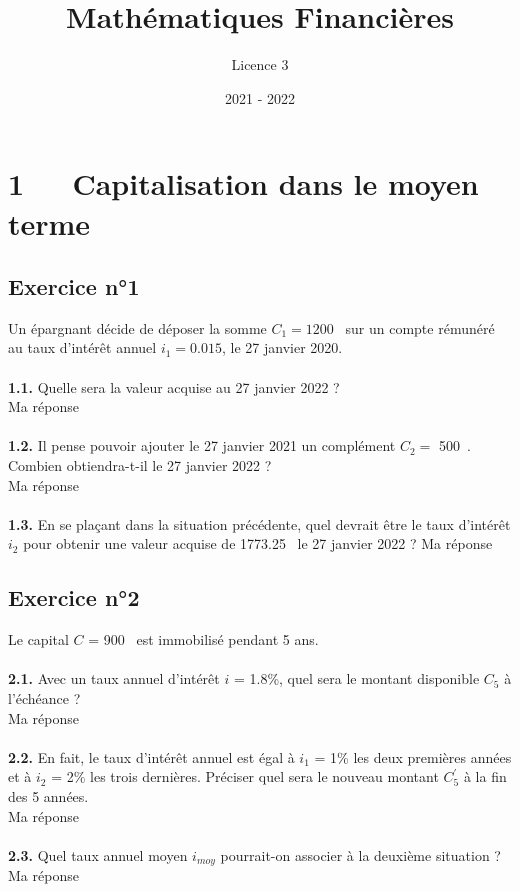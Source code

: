 \documentclass{article}
\title{Mathématiques Financières}
\author{Licence 3}
\date{2021 - 2022}
\begin{document}
\normalsize
\maketitle

\renewcommand*\contentsname{Table des matières}
\newpage

\section{1   Capitalisation dans le moyen terme}
\subsection{Exercice n°1}
\textcolor{exogris}{
Un épargnant décide de déposer la somme $C_1 = 1200$ \texteuro sur un compte rémunéré au taux d’intérêt annuel $i_1 = 0.015$, le 27 janvier 2020.
}
\\\\ \textcolor{exogris}{\textbf{1.1.}
Quelle sera la valeur acquise au 27 janvier 2022 ?
}
\\%
Ma réponse
\\%
\\%
\textcolor{exogris}{\textbf{1.2.}
Il pense pouvoir ajouter le 27 janvier 2021 un complément $C_2 =$ 500 \texteuro. Combien obtiendra-t-il le 27 janvier 2022 ?
}
\\%
Ma réponse
\\%
\\%
\textcolor{exogris}{\textbf{1.3.}
En se plaçant dans la situation précédente, quel devrait être le taux d’intérêt $i_2$ pour obtenir une valeur
acquise de 1773.25 \texteuro le 27 janvier 2022 ?
}%
Ma réponse


\subsection{Exercice n°2}
\textcolor{exogris}{
Le capital $C$ = 900 \texteuro est immobilisé pendant 5 ans.
}
\\\\ \textcolor{exogris}{\textbf{2.1.}
Avec un taux annuel d’intérêt $i$ = 1.8\%, quel sera le montant disponible $C_5$ à l’échéance ?
}
\\%
Ma réponse
\\%
\\%
\textcolor{exogris}{\textbf{2.2.}
En fait, le taux d’intérêt annuel est égal à $i_1$ = 1\% les deux premières années et à $i_2$ = 2\% les trois dernières. Préciser quel sera le nouveau montant $C^{'}_5$ à la fin des 5 années.
}
\\%
Ma réponse
\\%
\\%
\textcolor{exogris}{\textbf{2.3.}
Quel taux annuel moyen $i_{moy}$ pourrait-on associer à la deuxième situation ?
}%
\\%
Ma réponse
\end{document}
